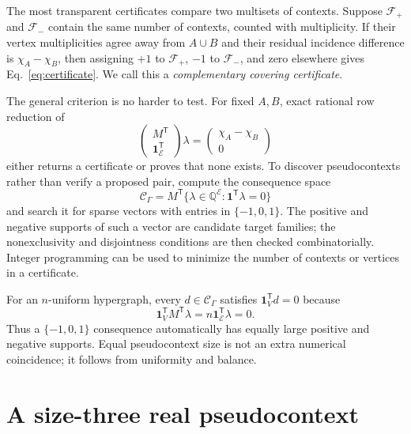 \documentclass[
  twocolumn,
  aps,
  pra,
  floatfix,
  amsmath,amssymb,
  longbibliography
]{revtex4-2}
\theoremstyle{definition}
\theoremstyle{remark}
\newcommand{\E}{\mathcal E}
\newcommand{\one}{\mathbf 1}
\begin{document}
The most transparent certificates compare two multisets of contexts.
Suppose $\mathcal F_+$ and $\mathcal F_-$ contain the same number of
contexts, counted with multiplicity.  If their vertex multiplicities agree
away from $A\cup B$ and their residual incidence difference is
$\chi_A-\chi_B$, then assigning $+1$ to $\mathcal F_+$, $-1$ to
$\mathcal F_-$, and zero elsewhere gives Eq.~\eqref{eq:certificate}.  We call
this a \emph{complementary covering certificate}.

The general criterion is no harder to test.  For fixed $A,B$, exact rational
row reduction of
\begin{equation}
 \begin{pmatrix}M^{\mathsf T}\\ \one_\E^{\mathsf T}\end{pmatrix}\lambda
 =
 \begin{pmatrix}\chi_A-\chi_B\\0\end{pmatrix}
 \label{eq:algorithm}
\end{equation}
either returns a certificate or proves that none exists.  To discover
pseudocontexts rather than verify a proposed pair, compute the consequence
space
\begin{equation}
 \mathcal C_\Gamma
 =M^{\mathsf T}\{\lambda\in\mathbb Q^{\E}:
                   \one^{\mathsf T}\lambda=0\}
 \label{eq:consequence-space}
\end{equation}
and search it for sparse vectors with entries in $\{-1,0,1\}$.  The positive
and negative supports of such a vector are candidate target families; the
nonexclusivity and disjointness conditions are then checked combinatorially.
Integer programming can be used to minimize the number of contexts or
vertices in a certificate.

For an $n$-uniform hypergraph, every $d\in\mathcal C_\Gamma$ satisfies
$\one_V^{\mathsf T}d=0$ because
\[
 \one_V^{\mathsf T}M^{\mathsf T}\lambda
 =n\one_\E^{\mathsf T}\lambda=0.
\]
Thus a $\{-1,0,1\}$ consequence automatically has equally large positive
and negative supports.  Equal pseudocontext size is not an extra numerical
coincidence; it follows from uniformity and balance.

\section{A size-three real pseudocontext}
\label{sec:mayet}
\end{document}

